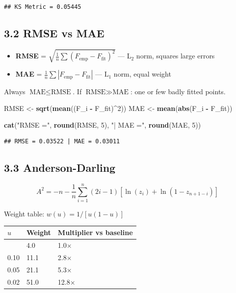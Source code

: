 \documentclass[
]{article}
\newenvironment{Shaded}{\begin{snugshade}}{\end{snugshade}}
\newcommand{\DecValTok}[1]{\textcolor[rgb]{0.00,0.00,0.81}{#1}}
\newcommand{\FunctionTok}[1]{\textcolor[rgb]{0.13,0.29,0.53}{\textbf{#1}}}
\newcommand{\NormalTok}[1]{#1}
\newcommand{\OtherTok}[1]{\textcolor[rgb]{0.56,0.35,0.01}{#1}}
\newcommand{\SpecialCharTok}[1]{\textcolor[rgb]{0.81,0.36,0.00}{\textbf{#1}}}
\newcommand{\StringTok}[1]{\textcolor[rgb]{0.31,0.60,0.02}{#1}}
\newcounter{none} %
\providecommand{\tightlist}{%
  \setlength{\itemsep}{0pt}\setlength{\parskip}{0pt}}
\begin{document}
\begin{verbatim}
## KS Metric = 0.05445
\end{verbatim}

\subsection{3.2 RMSE vs MAE}\label{rmse-vs-mae}

\begin{itemize}
\tightlist
\item
  \textbf{RMSE} =
  \(\sqrt{\frac{1}{n}\sum(F_{\text{emp}} - F_{\text{fit}})^2}\) ---
  L\(_2\) norm, squares large errors
\item
  \textbf{MAE} = \(\frac{1}{n}\sum|F_{\text{emp}} - F_{\text{fit}}|\)
  --- L\(_1\) norm, equal weight
\end{itemize}

Always \(\text{MAE} \leq \text{RMSE}\). If
\(\text{RMSE} \gg \text{MAE}\): one or few badly fitted points.

\begin{Shaded}
\begin{Highlighting}[]
\NormalTok{RMSE }\OtherTok{\textless{}{-}} \FunctionTok{sqrt}\NormalTok{(}\FunctionTok{mean}\NormalTok{((F\_i }\SpecialCharTok{{-}}\NormalTok{ F\_fit)}\SpecialCharTok{\^{}}\DecValTok{2}\NormalTok{))}
\NormalTok{MAE  }\OtherTok{\textless{}{-}} \FunctionTok{mean}\NormalTok{(}\FunctionTok{abs}\NormalTok{(F\_i }\SpecialCharTok{{-}}\NormalTok{ F\_fit))}

\FunctionTok{cat}\NormalTok{(}\StringTok{"RMSE ="}\NormalTok{, }\FunctionTok{round}\NormalTok{(RMSE, }\DecValTok{5}\NormalTok{), }\StringTok{"| MAE ="}\NormalTok{, }\FunctionTok{round}\NormalTok{(MAE, }\DecValTok{5}\NormalTok{))}
\end{Highlighting}
\end{Shaded}

\begin{verbatim}
## RMSE = 0.03522 | MAE = 0.03011
\end{verbatim}

\subsection{3.3 Anderson-Darling}\label{anderson-darling}

\[A^2 = -n - \frac{1}{n}\sum_{i=1}^n (2i-1)[\ln(z_i) + \ln(1-z_{n+1-i})]\]

Weight table: \(w(u) = 1/[u(1-u)]\)

{\def\LTcaptype{none} %
\begin{longtable}[]{@{}lll@{}}
\toprule\noalign{}
\(u\) & Weight & Multiplier vs baseline \\
\midrule\noalign{}
\endhead
\bottomrule\noalign{}
\endlastfoot
0.50 & 4.0 & 1.0× \\
0.10 & 11.1 & 2.8× \\
0.05 & 21.1 & 5.3× \\
0.02 & 51.0 & 12.8× \\
\end{longtable}
}
\end{document}
